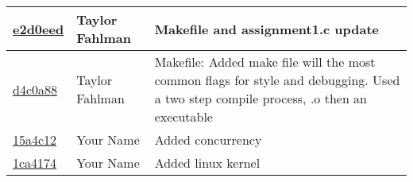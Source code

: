 \begin{tabular}{l l l}
\href{https://github.com/fahlmant/cs444/commit/e2d0eedfaec7397cf59d7f1fd46886026f0f1727}{e2d0eed} & Taylor Fahlman & Makefile and assignment1.c update\\\hline
\href{https://github.com/fahlmant/cs444/commit/d4c0a889450f5e33eeee262f56cea203a29aed0a}{d4c0a88} & Taylor Fahlman & Makefile:     Added make file will the most common flags for style and debugging. Used a two step compile process, .o then an executable\\\hline
\href{https://github.com/fahlmant/cs444/commit/15a4c12977816ab8bab1fe5f5a9b3c3774a8367a}{15a4c12} & Your Name & Added concurrency\\\hline
\href{https://github.com/fahlmant/cs444/commit/1ca41740bd9248799f23d5798a4a82d99e63ba5a}{1ca4174} & Your Name & Added linux kernel\\\hline\end{tabular}
